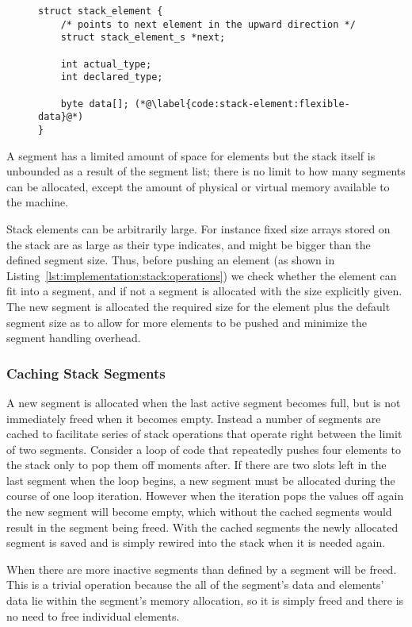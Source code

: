 \begin{figure}[h]
  \centering
  \begin{lstlisting}[language={[ANSI]C},%
    caption={Structure defining the stack},%
    label={lst:implementation:stack:element}]
struct stack_element {
    /* points to next element in the upward direction */
    struct stack_element_s *next;

    int actual_type;
    int declared_type;

    byte data[]; (*@\label{code:stack-element:flexible-data}@*)
}
  \end{lstlisting}
\end{figure}

A segment has a limited amount of space for elements but the stack itself is
unbounded as a result of the segment list; there is no limit to how many
segments can be allocated, except the amount of physical or virtual memory
available to the machine.

Stack elements can be arbitrarily large. For instance fixed size arrays stored
on the stack are as large as their type indicates, and might be bigger than the
defined segment size. Thus, before pushing an element (as shown in
Listing~\ref{lst:implementation:stack:operations}) we check whether the element
can fit into a segment, and if not a segment is allocated with the size
explicitly given. The new segment is allocated the required size for the element
plus the default segment size as to allow for more elements to be pushed and
minimize the segment handling overhead.

\subsubsection{Caching Stack Segments}

A new segment is allocated when the last active segment becomes full, but is not
immediately freed when it becomes empty. Instead a number of segments are cached
to facilitate series of stack operations that operate right between the limit of
two segments. Consider a loop of code that repeatedly pushes four elements to
the stack only to pop them off moments after. If there are two slots left in the
last segment when the loop begins, a new segment must be allocated during the
course of one loop iteration. However when the iteration pops the values off
again the new segment will become empty, which without the cached segments would
result in the segment being freed. With the cached segments the newly allocated
segment is saved and is simply rewired into the stack when it is needed again.

When there are more inactive segments than defined by
 a segment will be freed. This is a trivial
operation because the all of the segment's data and elements' data lie within
the segment's memory allocation, so it is simply freed and there is no need to
free individual elements.

